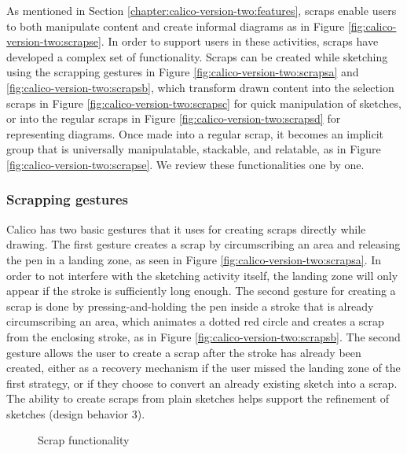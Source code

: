 As mentioned in Section \ref{chapter:calico-version-two:features}, scraps enable users to both manipulate content and create informal diagrams as in Figure \ref{fig:calico-version-two:scrapse}. In order to support users in these activities, scraps have developed a complex set of functionality. Scraps can be created while sketching using the scrapping gestures in Figure \ref{fig:calico-version-two:scrapsa} and \ref{fig:calico-version-two:scrapsb}, which transform drawn content into the selection scraps in Figure \ref{fig:calico-version-two:scrapsc} for quick manipulation of sketches, or into the regular scraps in Figure \ref{fig:calico-version-two:scrapsd} for representing diagrams. Once made into a regular scrap, it becomes an implicit group that is universally manipulatable, stackable, and relatable, as in Figure \ref{fig:calico-version-two:scrapse}. We review these functionalities one by one.

\subsubsection{Scrapping gestures} Calico has two basic gestures that it uses for creating scraps directly while drawing. The first gesture creates a scrap by circumscribing an area and releasing the pen in a landing zone, as seen in Figure \ref{fig:calico-version-two:scrapsa}. In order to not interfere with the sketching activity itself, the landing zone will only appear if the stroke is sufficiently long enough. The second gesture for creating a scrap is done by pressing-and-holding the pen inside a stroke that is already circumscribing an area, which animates a dotted red circle and creates a scrap from the enclosing stroke, as in Figure \ref{fig:calico-version-two:scrapsb}. The second gesture allows the user to create a scrap after the stroke has already been created, either as a recovery mechanism if the user missed the landing zone of the first strategy, or if they choose to convert an already existing sketch into a scrap. The ability to create scraps from plain sketches helps support the refinement of sketches (design behavior 3).

\begin{figure}%
  \centering
   \caption {Scrap functionality}
   \label{fig:calico-version-two:scraps}
\end{figure}%

